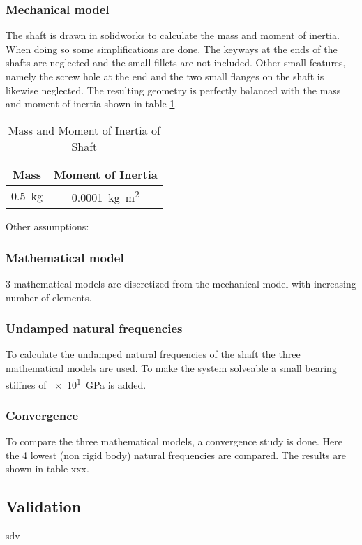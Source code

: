 \subsubsection{Mechanical model}
The shaft is drawn in solidworks to calculate the mass and moment of inertia. When doing so some simplifications are done.
The keyways at the ends of the shafts are neglected and the small fillets are not included. Other small features, namely the screw hole at the end and the two small flanges on the shaft is likewise neglected.
The resulting geometry is perfectly balanced with the mass and moment of inertia shown in table \ref{tab:shaft_mass_moment}.
\begin{table}[htbp]
    \centering
    \caption{Mass and Moment of Inertia of Shaft}
    \label{tab:shaft_mass_moment}
    \begin{tabular}{@{}cc@{}}
        \toprule
        Mass                    &   Moment of Inertia                       \\ \midrule
        \SI{0.5}{\kilo \gram}   &   \SI{0.0001}{\kilo \gram \square \meter} \\ \bottomrule
    \end{tabular}
\end{table}

Other assumptions:

\subsubsection{Mathematical model}
3 mathematical models are discretized from the mechanical model with increasing number of elements.

\subsubsection{Undamped natural frequencies}
To calculate the undamped natural frequencies of the shaft the three mathematical models are used. To make the system solveable a small bearing stiffnes of \SI{e1}{\giga \pascal} is added.

\subsubsection{Convergence}
To compare the three mathematical models, a convergence study is done. Here the 4 lowest (non rigid body) natural frequencies are compared. The results are shown in table xxx.


\subsection{Validation}
sdv

